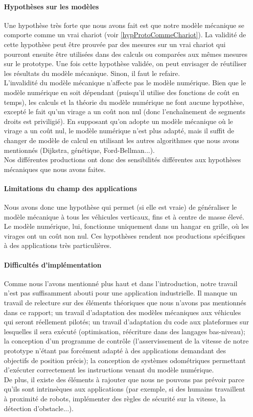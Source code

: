 \paragraph{Hypothèses sur les modèles} Une hypothèse très forte que nous avons fait est que notre modèle mécanique se comporte comme un vrai chariot (voir \ref{hypProtoCommeChariot}). La validité de cette hypothèse peut être prouvée par des mesures sur un vrai chariot qui pourront ensuite être utilisées dans des calculs ou comparées aux mêmes mesures sur le prototype. Une fois cette hypothèse validée, on peut envisager de réutiliser les résultats du modèle mécanique. Sinon, il faut le refaire.\\
L'invalidité du modèle mécanique n'affecte pas le modèle numérique. Bien que le modèle numérique en soit dépendant (puisqu'il utilise des fonctions de coût en temps), les calculs et la théorie du modèle numérique ne font aucune hypothèse, excepté le fait qu'un virage a un coût non nul (donc l'enchaînement de segments droits est priviligié). En supposant qu'on adopte un modèle mécanique où le virage a un coût nul, le modèle numérique n'est plus adapté, mais il suffit de changer de modèle de calcul en utilisant les autres algorithmes que nous avons mentionnés (Dijkstra, génétique, Ford-Bellman...).\\
Nos différentes productions ont donc des sensibilités différentes aux hypothèses mécaniques que nous avons faites.
\paragraph{Limitations du champ des applications}Nous avons donc une hypothèse qui permet (si elle est vraie) de généraliser le modèle mécanique à tous les véhicules verticaux, fins et à centre de masse élevé. Le modèle numérique, lui, fonctionne uniquement dans un hangar en grille, où les virages ont un coût non nul. Ces hypothèses rendent nos productions spécifiques à des applications très particulières.
\paragraph{Difficultés d'implémentation} Comme nous l'avons mentionné plus haut et dans l'introduction, notre travail n'est pas suffisamment abouti pour une application industrielle. Il manque un travail de relecture sur des éléments théoriques que nous n'avons pas mentionnés dans ce rapport; un travail d'adaptation des modèles mécaniques aux véhicules qui seront réellement pilotés; un travail d'adaptation du code aux plateformes sur lesquelles il sera exécuté (optimisation, réécriture dans des langages bas-niveau); la conception d'un programme de contrôle (l'asservissement de la vitesse de notre prototype n'étant pas forcément adapté à des applications demandant des objectifs de position précis); la conception de systèmes odométriques permettant d'exécuter correctement les instructions venant du modèle numérique.\\
De plus, il existe des éléments à rajouter que nous ne pouvons pas prévoir parce qu'ils sont intrinsèques aux applications (par exemple, si des humains travaillent à proximité de robots, implémenter des règles de sécurité sur la vitesse, la détection d'obstacle...).
